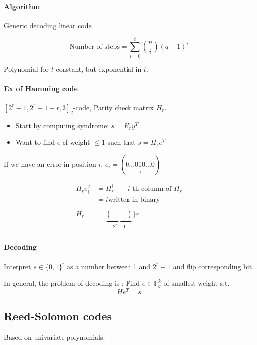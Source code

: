 \documentclass{article}
\begin{document}
\paragraph{Algorithm} Generic decoding linear code


\begin{algorithm}
\end{algorithm}

\[ \text{Number of steps}=\sum_{i=0}^t  \binom{n}{i} (q-1)^i\]

Polynomial for $t$ constant, but exponential in $t$.

\paragraph{Ex of Hamming code} $[2^r-1,2^r-1-r,3]_2$-code, Parity check matrix $H_r$.
\begin{itemize}
\item Start by computing syndrome: $s=H_ry^T$
\item Want to find $e$ of weight $\leq 1$ such that $s=H_re^T$
\end{itemize}
If we have an error in position $i$, $e_i=(0...0\underbrace{1}_{i}0...0)$

\begin{align*}
H_re_i^T & = H_r^i \qquad \text{$i$-th column of $H_r$}\\
&= i \text{written in binary}\\
\; \\
H_r &= 
\underbrace{
\begin{pmatrix}
\; & \; \\
\; & \; \\
\end{pmatrix}}_{2^r -1 } \Bigg\} r\\
\end{align*}

\paragraph{Decoding} Interpret $s\in \{0,1\}^r$ as a number between 1 and $2^r-1$ and flip corresponding bit.

In general, the problem of decoding is : Find $e\in \mathbb{F}_q^k$ of smallest weight s.t.
\[He^T=s\]

\subsection{Reed-Solomon codes}
Based on univariate polynomials.
\end{document}

